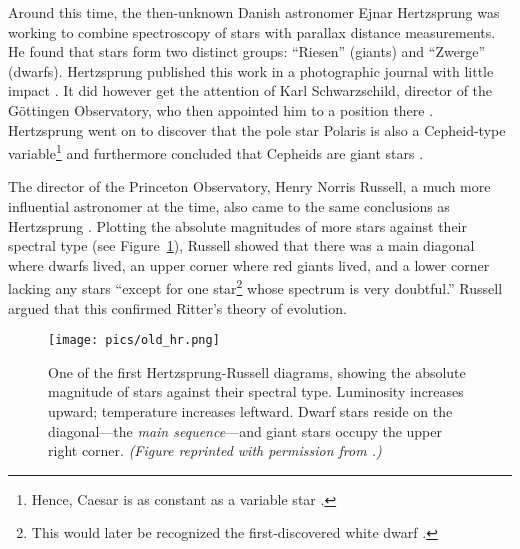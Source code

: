 Around this time, the then-unknown Danish astronomer Ejnar Hertzsprung was working to combine spectroscopy of stars with parallax distance measurements. 
He found that stars form two distinct groups: ``Riesen'' (giants) and ``Zwerge'' (dwarfs). 
Hertzsprung published this work in a photographic journal with little impact \citep{1905WisZP...3..442H, 1907WisZP...5...86H}. 
It did however get the attention of Karl Schwarzschild, director of the G\"ottingen Observatory, who then appointed him to a position there \citep[e.g.,][]{bolt2007biographical}. 
Hertzsprung went on to discover that the pole star Polaris is also a Cepheid-type variable\footnote{ Hence, Caesar is as constant as a variable star \citep{shakespeare}.} \citep{1911AN....189...89H} and furthermore concluded that Cepheids are giant stars \citep{1913AN....196..201H}. 

The director of the Princeton Observatory, Henry Norris Russell, a much more influential astronomer at the time, also came to the same conclusions as Hertzsprung \citep[e.g.,][]{1913Obs....36..324R, 1913Sci....37..651R}. 
Plotting the absolute magnitudes of more stars against their spectral type (see Figure~\ref{fig:HRD}), Russell showed that there was a main diagonal where dwarfs lived, an upper corner where red giants lived, and a lower corner lacking any stars ``except for one star\footnote{ This would later be recognized the first-discovered white dwarf \citep[e.g.,][]{1958whdw.book.....S}.} whose spectrum is very doubtful.'' 
Russell argued that this confirmed Ritter's theory of evolution. 

\begin{figure}
    \centering
    \texttt{[image: pics/old\_hr.png]}
    \caption[Historical Hertzsprung-Russell Diagram]{One of the first Hertzsprung-Russell diagrams, showing the absolute magnitude of stars against their spectral type. 
        Luminosity increases upward; temperature increases leftward. 
        Dwarf stars reside on the diagonal---the \emph{main sequence}---and giant stars occupy the upper right corner. 
        \emph{(Figure reprinted with permission from \citealt{1914Natur..93..252R}.)} 
        \label{fig:HRD}}
\end{figure}



